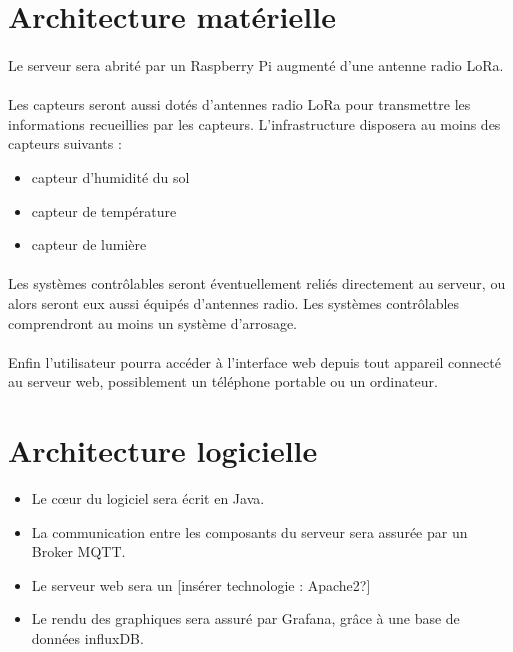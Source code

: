 \documentclass[11pt,a4paper]{article}
\begin{document}
\section{Architecture matérielle}
\paragraph{}Le serveur sera abrité par un Raspberry Pi augmenté d'une antenne radio LoRa.

\paragraph{}Les capteurs seront aussi dotés d'antennes radio LoRa pour transmettre les informations recueillies par les capteurs. L'infrastructure disposera au moins des capteurs suivants : 
\begin{itemize}
    \item capteur d'humidité du sol
    \item capteur de température
    \item capteur de lumière
\end{itemize}

\paragraph{}Les systèmes contrôlables seront éventuellement reliés directement au serveur, ou alors seront eux aussi équipés d'antennes radio. Les systèmes contrôlables comprendront au moins un système d'arrosage.

\paragraph{}Enfin l'utilisateur pourra accéder à l'interface web depuis tout appareil connecté au serveur web, possiblement un téléphone portable ou un ordinateur.

\section{Architecture logicielle}
\begin{itemize}
    \item Le cœur du logiciel sera écrit en Java.
    \item La communication entre les composants du serveur sera assurée par un Broker MQTT.
    \item Le serveur web sera un  [insérer technologie : Apache2?]
    \item Le rendu des graphiques sera assuré par Grafana, grâce à une base de données influxDB.
\end{itemize}
\end{document}
